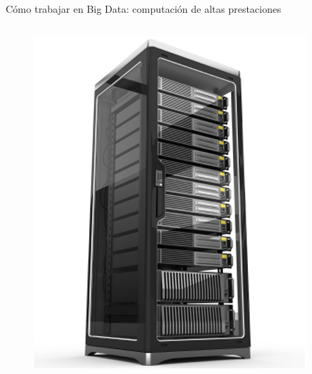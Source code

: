 \begin{frame}{\large Cómo trabajar en Big Data: computación de altas prestaciones}
\begin{columns}
				\begin{figure}
					\includegraphics[width=\textwidth]{./Images/cluster.jpg}
				\end{figure}

			\end{columns}
			
		\end{frame}